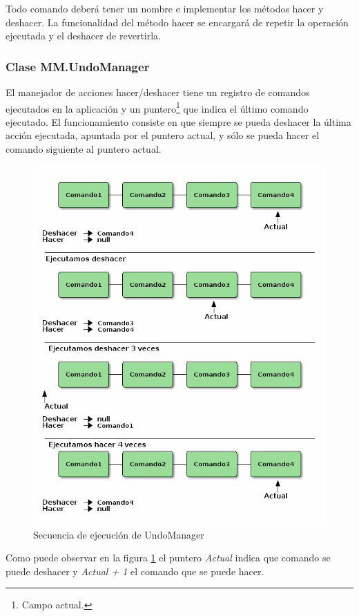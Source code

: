 Todo comando deberá tener un nombre e implementar los métodos hacer y deshacer. La funcionalidad del 
método hacer se encargará de repetir la operación ejecutada y el deshacer de revertirla.

\subsubsection{Clase MM.UndoManager}

El manejador de acciones hacer/deshacer tiene un registro de comandos ejecutados en la aplicación y un puntero\footnote{Campo actual.} que indica el último comando ejecutado. El funcionamiento consiste en que siempre se pueda deshacer la última acción ejecutada, apuntada por el puntero actual, y sólo se pueda hacer el comando siguiente al puntero actual.

\begin{figure}[tbph]
\centering
\includegraphics[width=0.7\linewidth]{imagenes/undomangerEjecucion.png}
\caption{Secuencia de ejecución de UndoManager}
\label{fig:undomanager-ejecucion}
\end{figure}
 
Como puede observar en la figura \ref{fig:undomanager-ejecucion} el puntero \textit{Actual} indica que comando se puede deshacer y \textit{Actual + 1} el comando que se puede hacer. 

